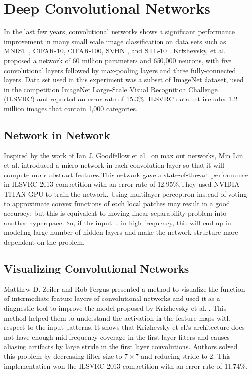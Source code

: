 \documentclass{llncs}
\begin{document}
 

\section {Deep Convolutional Networks}
In the last few years, convolutional networks shows a significant performance improvement in many small scale image classification on data sets  such as MNIST \cite{Ciresan:2012g}, CIFAR-10, CIFAR-100, SVHN \cite{lee2014deeply}, and STL-10 \cite{deepfwd}. Krizhevsky, et al. \cite{Krizhevsky2012a} proposed a network  of 60 million parameters and 650,000 neurons, with five convolutional layers followed by max-pooling layers and three fully-connected layers. Data set used in this experiment was a subset of ImageNet dataset, used in the competition ImageNet Large-Scale Visual Recognition Challenge (ILSVRC) \cite{imagenet} and reported an error rate of 15.3\%. ILSVRC data set includes 1.2 million images that contain 1,000 categories. 

\vspace*{-5mm}

\subsection{Network in Network }
Inspired by the work of Ian J. Goodfellow et al..\cite{Goodfellow2013} on max out networks,  Min Lin et al. \cite{Lin2013} introduced a micro-network in each convolution layer so that it will compute more abstract features.This network gave a state-of-the-art performance in  ILSVRC 2013 competition with an error rate of 12.95\%.They used NVIDIA TITAN GPU to train the network. Using multilayer perceptron instead of voting to approximate convex functions of each  local patches may result in a good accuracy; but this is equivalent to moving linear separability problem into another hyperspace. So, if the input is in high frequency, this will end up in modeling large number of hidden layers and make the network structure more dependent on the problem.
\vspace*{-3mm}
\subsection{Visualizing Convolutional Networks}
\vspace*{-3mm}
Matthew D. Zeiler and Rob Fergus \cite{Zeiler2013} presented a method to visualize the function of intermediate feature layers of convolutional networks and used it as a diagnostic tool to improve  the model proposed by Krizhevsky et al. \cite{Krizhevsky2012a}. This method helped  them  to understand  the activation in the feature maps with respect to the input patterns. It shows that Krizhevsky et al.'s architecture does not have  enough mid frequency coverage in the first layer filters and causes aliasing artifacts by large stride in the first layer convolutions. Authors solved this problem by decreasing filter size to $7\times7$ and reducing stride to 2. This implementation won the  ILSVRC 2013 competition with an error rate of 11.74\%. 
\end{document}
